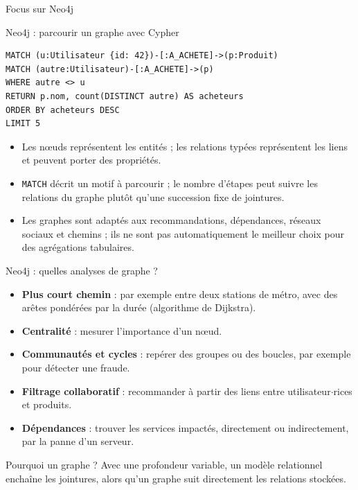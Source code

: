 \begin{frame}[standout]

    Focus sur Neo4j


\end{frame}

\begin{frame}[fragile]{Neo4j : parcourir un graphe avec Cypher}
    \begin{verbatim}
MATCH (u:Utilisateur {id: 42})-[:A_ACHETE]->(p:Produit)
MATCH (autre:Utilisateur)-[:A_ACHETE]->(p)
WHERE autre <> u
RETURN p.nom, count(DISTINCT autre) AS acheteurs
ORDER BY acheteurs DESC
LIMIT 5
\end{verbatim}
    \begin{itemize}
        \item Les nœuds représentent les entités ; les relations typées
              représentent les liens et peuvent porter des propriétés.
        \item \texttt{MATCH} décrit un motif à parcourir ; le nombre d'étapes
              peut suivre les relations du graphe plutôt qu'une succession fixe
              de jointures.
        \item Les graphes sont adaptés aux recommandations, dépendances, réseaux
              sociaux et chemins ; ils ne sont pas automatiquement le meilleur
              choix pour des agrégations tabulaires.
    \end{itemize}
\end{frame}

\begin{frame}{Neo4j : quelles analyses de graphe ?}
    \begin{itemize}
        \item \textbf{Plus court chemin} : par exemple entre deux stations de
              métro, avec des arêtes pondérées par la durée (algorithme de
              Dijkstra).
        \item \textbf{Centralité} : mesurer l'importance d'un nœud.
        \item \textbf{Communautés et cycles} : repérer des groupes ou des
              boucles, par exemple pour détecter une fraude.
        \item \textbf{Filtrage collaboratif} : recommander à partir des liens
              entre utilisateur$\cdot$rices et produits.
        \item \textbf{Dépendances} : trouver les services impactés, directement
              ou indirectement, par la panne d'un serveur.
    \end{itemize}

    \begin{examplebox}{Pourquoi un graphe ?}
        Avec une profondeur variable, un modèle relationnel enchaîne les
        jointures, alors qu'un graphe suit directement les relations stockées.
    \end{examplebox}
\end{frame}

